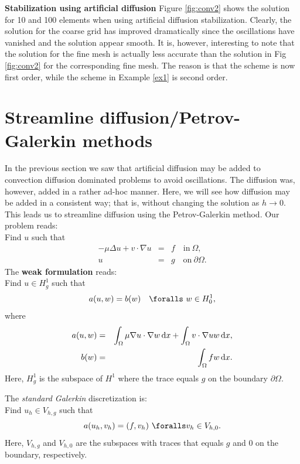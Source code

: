 \begin{example}{\textbf{Stabilization using artificial diffusion}}
Figure \ref{fig:conv2} shows the solution for 10 and 100 elements when using artificial diffusion 
stabilization.  Clearly, the solution for the coarse grid has improved dramatically since the
oscillations have vanished and the solution appear smooth. It is, however, interesting to note
that the solution for the fine mesh is actually less accurate than the solution in Fig \ref{fig:conv2} 
for the corresponding fine mesh. The reason is that the scheme is now first order, while the 
scheme in Example \ref{ex1} is second order.    
\end{example}



\section{Streamline diffusion/Petrov-Galerkin methods}
In the previous section we saw that artificial diffusion may be added to convection diffusion dominated problems to avoid 
oscillations. The diffusion was, however, added in a rather ad-hoc manner.  
Here, we will see how diffusion may be added in a consistent way; 
that is, without changing the solution as $h\rightarrow 0$. 
This leads us to streamline diffusion using the Petrov-Galerkin method.
Our problem reads: \\ 
Find $u$ such that 
\begin{eqnarray*}
-\mu\Delta u + v\cdot\nabla u &=& f \quad \textrm{in}\ \Omega, \\
u&=& g \quad \textrm{on}\ \partial\Omega .
\end{eqnarray*}
The \textbf{weak formulation} reads: \\
Find $u\in H_g^1$ such that 
\[
a(u,w) = b(w) \quad \foralls\ w\in H_0^1, 
\]
where
\begin{eqnarray*}
a(u,w) &=& \int_\Omega\mu\nabla u \cdot \nabla w \, \mathrm{d}x + \int_\Omega v \cdot \nabla uw \, \mathrm{d}x,   \\
b(w) &=& \int_\Omega fw \, \mathrm{d}x . 
\end{eqnarray*}
Here, $H_g^1$ is the subspace of $H^1$ where the trace equals $g$ on the boundary $\partial \Omega$.  

The \textit{standard Galerkin} discretization is: \\
Find $u_h\in V_{h,g}$ such that 
\begin{equation}
\label{Galerkin}
a(u_h, v_h) = (f,v_h)\ \foralls v_h\in V_{h,0}.
\end{equation}
Here, $V_{h,g}$  and $V_{h,0}$ are the subspaces with traces that equals $g$ and $0$ on 
the boundary, respectively.  

